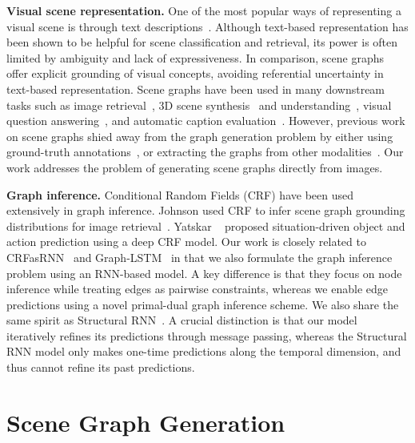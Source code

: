 \documentclass[10pt,twocolumn,letterpaper]{article}
\begin{document}
\noindent \textbf{Visual scene representation.}
One of the most popular ways of representing a visual scene is through text descriptions~\cite{gupta2008beyond,sadeghi2011recognition,zitnick2013learning}. Although text-based representation has been shown to be helpful for scene classification and retrieval, its power is often limited by ambiguity and lack of expressiveness.
In comparison, scene graphs~\cite{Johnson2015-lm} offer explicit grounding of visual concepts, avoiding referential uncertainty in text-based representation. 
Scene graphs have been used in many downstream tasks such as image retrieval~\cite{Johnson2015-lm}, 3D scene synthesis~\cite{chang2014learning} and understanding~\cite{Fisher2011-ci}, visual question answering~\cite{teney2016graph}, and automatic caption evaluation~\cite{spice2016}. 
However, previous work on scene graphs shied away from the graph generation problem by either using ground-truth annotations~\cite{Johnson2015-lm,teney2016graph}, or extracting the graphs from other modalities~\cite{spice2016,chang2014learning,Fisher2011-ci}. Our work addresses the problem of generating scene graphs directly from images.

\vspace{5pt}

\noindent \textbf{Graph inference.} 
Conditional Random Fields (CRF) have been used extensively in graph inference. Johnson \etal used CRF to infer scene graph grounding distributions for image retrieval~\cite{Johnson2015-lm}.  Yatskar \etal~\cite{yatskarsituation} proposed situation-driven object and action prediction using a deep CRF model. Our work is closely related to CRFasRNN~\cite{crfasrnn} and Graph-LSTM~\cite{glstm} in that we also formulate the graph inference problem using an RNN-based model. A key difference is that they focus on node inference while treating edges as pairwise constraints, whereas we enable  edge predictions using a novel primal-dual graph inference scheme.
We also share the same spirit as Structural RNN~\cite{jain2015structural}. A crucial distinction is that our model iteratively refines its predictions through message passing, whereas the Structural RNN model only makes one-time predictions along the temporal dimension, and thus cannot refine its past predictions.  

\section{Scene Graph Generation}
\label{sec:methods}
\end{document}
